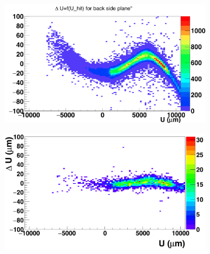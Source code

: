    \begin{figure}[!h]
    \centering
    \begin{subfigure}[t]{0.45\textwidth}
    \centering
      \includegraphics[width = \textwidth]{Pictures/deformation/deltaUU_6_deformed.png}
      \caption{}
      \label{fig:scatterDUU_deformed_back_resume}
    \end{subfigure}
    \hfill
    \begin{subfigure}[t]{0.45\textwidth}
      \centering
      \includegraphics[width = \textwidth]{Pictures/deformation/deltaUU_6_corrected1.png}
      \caption{}
      \label{fig:scatterDUU_corrected_back_resume}
    \end{subfigure}


\end{figure}
